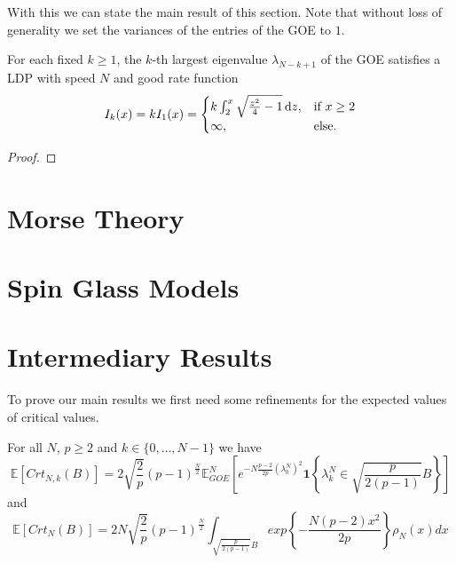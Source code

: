 With this we can state the main result of this section. Note that without loss of generality we set the variances of the entries of the GOE to $1$.
\begin{theorem}
	For each fixed $k\geq 1$, the $k$-th largest eigenvalue $\lambda_{N-k+1}$ of the GOE satisfies a LDP with speed $N$ and good rate function
	$$I_k(x)=kI_1(x)=\begin{cases}
						k\int_2^x\sqrt{\frac{z^2}{4}-1}\mathop{}\!\mathrm{d} z, &\mbox{if } x\geq 2 \\
						\infty, &\mbox{else.}
					  \end{cases}$$
\end{theorem}
\begin{proof}
\end{proof}

\section{Morse Theory}

\section{Spin Glass Models}

\section{Intermediary Results}
To prove our main results we first need some refinements for the expected values of critical values.

\begin{theorem}
	For all $N$, $p\geq 2$ and $k\in\{0,\dots,N-1\}$ we have
	\begin{equation}\label{thm:2.1}
		\mathbb E[Crt_{N,k}(B)]=2\sqrt{\frac{2}{p}}(p-1)^{\frac{N}{2}}\mathbb E_{GOE}^N\left[e^{-N\frac{p-2}{2p}(\lambda_k^N)^2}\bm 1\left\{\lambda_k^N\in\sqrt{\frac{p}{2(p-1)}}B \right\}\right]
	\end{equation} and
	\begin{equation}\label{thm:2.2}
		\mathbb E[Crt_N(B)]=2N\sqrt{\frac{2}{p}}(p-1)^{\frac{N}{2}}\int_{\sqrt{\frac{p}{2(p-1)}}B}exp\left\{-\frac{N(p-2)x^2}{2p}\right\}\rho_N(x)dx
	\end{equation}
\end{theorem}

